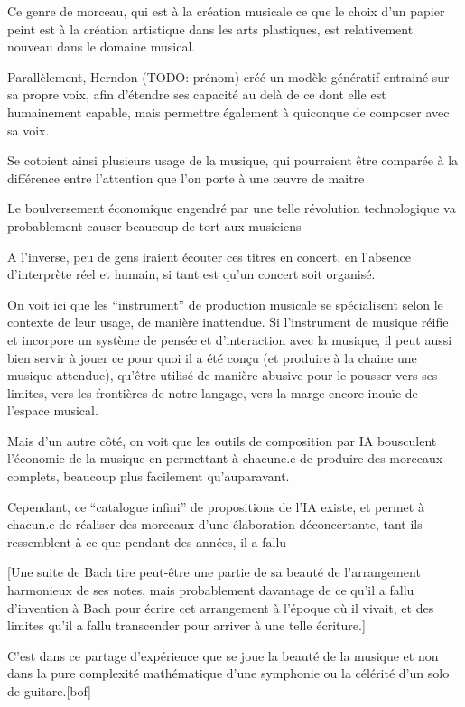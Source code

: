
Ce genre de morceau, qui est à la création musicale ce que le choix d'un papier peint est à la création artistique dans les arts plastiques, est relativement nouveau dans le domaine musical. 

Parallèlement, Herndon (TODO: prénom) créé un modèle génératif entrainé sur sa propre voix, afin d'étendre ses capacité au delà de ce dont elle est humainement capable, mais permettre également à quiconque de composer avec sa voix.

Se cotoient ainsi plusieurs usage de la musique, qui pourraient être comparée à la différence entre l'attention que l'on porte à une œuvre de maitre 

Le boulversement économique engendré par une telle révolution technologique va probablement causer beaucoup de tort aux musiciens

A l'inverse, peu de gens iraient écouter ces titres en concert, en l'absence d'interprète réel et humain, si tant est qu'un concert soit organisé.

On voit ici que les ``instrument'' de production musicale se spécialisent selon le contexte de leur usage, de manière inattendue.
Si l'instrument de musique réifie et incorpore un système de pensée et d'interaction avec la musique, il peut aussi bien servir à jouer ce pour quoi il a été conçu (et produire à la chaine une musique attendue), qu'être utilisé de manière abusive pour le pousser vers ses limites, vers les frontières de notre langage, vers la marge encore inouïe de l'espace musical.

Mais d'un autre côté, on voit que les outils de composition par IA bousculent l'économie de la musique en permettant à chacune.e de produire des morceaux complets, beaucoup plus facilement qu'auparavant.

Cependant, ce ``catalogue infini'' de propositions de l'IA existe, et permet à chacun.e de réaliser des morceaux d'une élaboration déconcertante, tant ils ressemblent à ce que pendant des années, il a fallu 

[Une suite de Bach tire peut-être une partie de sa beauté de l'arrangement harmonieux de ses notes, mais probablement davantage de ce qu'il a fallu d'invention à Bach pour écrire cet arrangement à l'époque où il vivait, et des limites qu'il a fallu transcender pour arriver à une telle écriture.]

C'est dans ce partage d'expérience que se joue la beauté de la musique et non dans la pure complexité mathématique d'une symphonie ou la célérité d'un solo de guitare.[bof]

